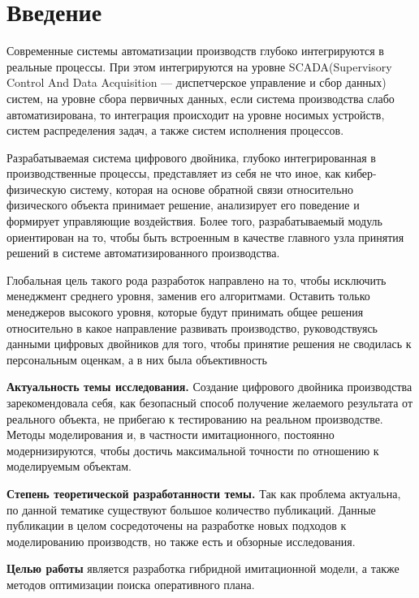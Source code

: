 \section*{Введение}
Современные системы автоматизации производств глубоко интегрируются в реальные процессы. При этом интегрируются на уровне SCADA(Supervisory Control And Data Acquisition — диспетчерское управление и сбор данных) систем, на уровне сбора первичных данных, если система производства слабо автоматизирована, то интеграция происходит на уровне носимых устройств, систем распределения задач, а также систем исполнения процессов. 

Разрабатываемая система цифрового двойника, глубоко интегрированная в производственные процессы, представляет из себя не что иное, как кибер-физическую систему, которая на основе обратной связи относительно физического объекта принимает решение, анализирует его поведение и формирует управляющие воздействия. Более того, разрабатываемый модуль ориентирован на то, чтобы быть встроенным в качестве главного узла принятия решений в системе автоматизированного производства.

Глобальная цель такого рода разработок направлено на то, чтобы исключить менеджмент среднего уровня, заменив его алгоритмами. Оставить только менеджеров высокого уровня, которые будут принимать общее решения относительно в какое направление развивать производство, руководствуясь данными цифровых двойников для того, чтобы принятие решения не сводилась к персональным оценкам, а в них была объективность

\newpage

\textbf{Актуальность темы исследования.} Создание цифрового двойника производства зарекомендовала себя, как безопасный способ получение желаемого результата от реального объекта, не прибегаю к тестированию на реальном производстве. Методы моделирования и, в частности имитационного, постоянно модернизируются, чтобы достичь максимальной точности по отношению к моделируемым объектам.

\textbf{Степень теоретической разработанности темы.} Так как проблема актуальна, по данной тематике существуют большое количество публикаций. Данные публикации в целом сосредоточены на разработке новых подходов к моделированию производств, но также есть и обзорные исследования.

\textbf{Целью работы} является разработка гибридной имитационной модели, а также методов оптимизации поиска оперативного плана.

